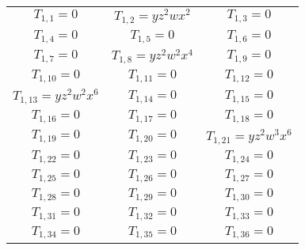 \begin{longtable}{|c|c|c|} 
\hline
$T_{1,1}= 0$&

$T_{1,2}= yz^2wx^2$&

$T_{1,3}= 0$\\

$T_{1,4}= 0$&

$T_{1,5}= 0$&

$T_{1,6}= 0$\\

$T_{1,7}= 0$&

$T_{1,8}= yz^2w^2x^4$&

$T_{1,9}= 0$\\

$T_{1,10}= 0$&

$T_{1,11}= 0$&

$T_{1,12}= 0$\\

$T_{1,13}= yz^2w^2x^6$&

$T_{1,14}= 0$&

$T_{1,15}= 0$\\

$T_{1,16}= 0$&

$T_{1,17}= 0$&

$T_{1,18}= 0$\\

$T_{1,19}= 0$&

$T_{1,20}= 0$&

$T_{1,21}= yz^2w^3x^6$\\

$T_{1,22}= 0$&

$T_{1,23}= 0$&

$T_{1,24}= 0$\\

$T_{1,25}= 0$&

$T_{1,26}= 0$&

$T_{1,27}= 0$\\

$T_{1,28}= 0$&

$T_{1,29}= 0$&

$T_{1,30}= 0$\\

$T_{1,31}= 0$&

$T_{1,32}= 0$&

$T_{1,33}= 0$\\

$T_{1,34}= 0$&

$T_{1,35}= 0$&

$T_{1,36}= 0$\\


\end{longtable}
